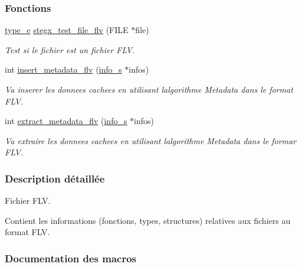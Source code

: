 \subsubsection*{Fonctions}
\begin{DoxyCompactItemize}
\item 
\hyperlink{a00047_af1ca434cca36ba9fb2a45f6cef3a16d6}{type\+\_\+e} \hyperlink{a00080_aeb8aa72db41eb744e933e7fed2a920a7}{stegx\+\_\+test\+\_\+file\+\_\+flv} (F\+I\+LE $\ast$file)
\begin{DoxyCompactList}\small\item\em Test si le fichier est un fichier F\+LV. \end{DoxyCompactList}\item 
int \hyperlink{a00080_aca61ada38d1e29a78be8587538cabdf6}{insert\+\_\+metadata\+\_\+flv} (\hyperlink{a00008_aa8ca908d92fb5bdd3c0a9e1f58b2cf03}{info\+\_\+s} $\ast$infos)
\begin{DoxyCompactList}\small\item\em Va inserer les donnees cachees en utilisant l\textquotesingle{}algorithme Metadata dans le format F\+LV. \end{DoxyCompactList}\item 
int \hyperlink{a00080_ac1c7c5c1221f121e1c0014efe23b82f8}{extract\+\_\+metadata\+\_\+flv} (\hyperlink{a00008_aa8ca908d92fb5bdd3c0a9e1f58b2cf03}{info\+\_\+s} $\ast$infos)
\begin{DoxyCompactList}\small\item\em Va extraire les donnees cachees en utilisant l\textquotesingle{}algorithme Metadata dans le formar F\+LV. \end{DoxyCompactList}\end{DoxyCompactItemize}


\subsubsection{Description détaillée}
Fichier F\+LV. 

Contient les informations (fonctions, types, structures) relatives aux fichiers au format F\+LV. 

\subsubsection{Documentation des macros}
\mbox{\label{a00080_a774ad0ace2d5c094fea23bd2ae1c76af}} 
